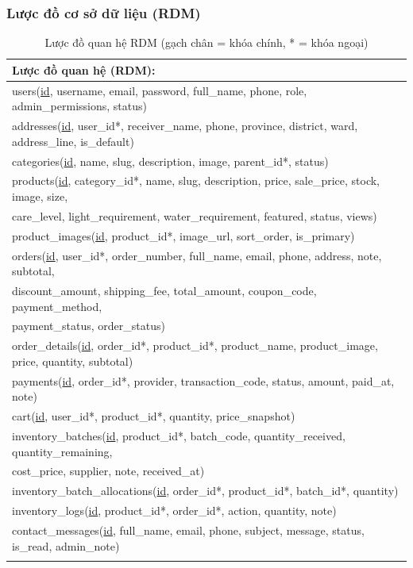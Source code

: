\documentclass[a4paper]{article}
\begin{document}
\subsubsection{Lược đồ cơ sở dữ liệu (RDM)}

\begin{longtable}{|p{\dimexpr\linewidth-2\tabcolsep-2\arrayrulewidth\relax}|}
\hline
\textbf{Lược đồ quan hệ (RDM):} \\
\hline
users(\underline{id}, username, email, password, full\_name, phone, role, admin\_permissions, status) \\
\hline
addresses(\underline{id}, user\_id*, receiver\_name, phone, province, district, ward, address\_line, is\_default) \\
\hline
categories(\underline{id}, name, slug, description, image, parent\_id*, status) \\
\hline
products(\underline{id}, category\_id*, name, slug, description, price, sale\_price, stock, image, size, \\
\quad\quad care\_level, light\_requirement, water\_requirement, featured, status, views) \\
\hline
product\_images(\underline{id}, product\_id*, image\_url, sort\_order, is\_primary) \\
\hline
orders(\underline{id}, user\_id*, order\_number, full\_name, email, phone, address, note, subtotal, \\
\quad\quad discount\_amount, shipping\_fee, total\_amount, coupon\_code, payment\_method, \\
\quad\quad payment\_status, order\_status) \\
\hline
order\_details(\underline{id}, order\_id*, product\_id*, product\_name, product\_image, price, quantity, subtotal) \\
\hline
payments(\underline{id}, order\_id*, provider, transaction\_code, status, amount, paid\_at, note) \\
\hline
cart(\underline{id}, user\_id*, product\_id*, quantity, price\_snapshot) \\
\hline
inventory\_batches(\underline{id}, product\_id*, batch\_code, quantity\_received, quantity\_remaining, \\
\quad\quad cost\_price, supplier, note, received\_at) \\
\hline
inventory\_batch\_allocations(\underline{id}, order\_id*, product\_id*, batch\_id*, quantity) \\
\hline
inventory\_logs(\underline{id}, product\_id*, order\_id*, action, quantity, note) \\
\hline
contact\_messages(\underline{id}, full\_name, email, phone, subject, message, status, is\_read, admin\_note) \\
\hline
\caption{Lược đồ quan hệ RDM (gạch chân = khóa chính, * = khóa ngoại)}
\end{longtable}
\end{document}
